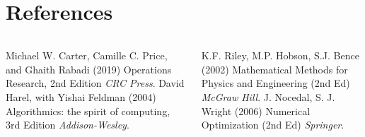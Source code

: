 \documentclass[c]{beamer}
\begin{document}
\section{References}

\begin{frame}
\footnotesize
\begin{thebibliography}{99} %
  \begin{columns}[t]
    \begin{column}{.45\textwidth}
       Michael W. Carter, Camille C. Price, and Ghaith Rabadi (2019)
        \newblock Operations Research, 2nd Edition
        \newblock \emph{CRC Press}.
         David Harel, with Yishai Feldman (2004)
          \newblock Algorithmics: the spirit of computing, 3rd Edition
          \newblock \emph{Addison-Wesley}.
    \end{column}
    \begin{column}{.45\textwidth}
       K.F. Riley, M.P. Hobson, S.J. Bence (2002)
        \newblock Mathematical Methods for Physics and Engineering (2nd Ed)
        \newblock \emph{McGraw Hill}.
       J. Nocedal, S. J. Wright (2006)
        \newblock Numerical Optimization (2nd Ed)
        \newblock \emph{Springer}.
    \end{column}
  \end{columns}
\end{thebibliography}
\end{frame}
\end{document}
